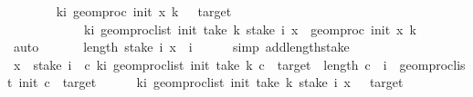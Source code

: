 \begin{isabellebody}
\ \ \ \ \ \ \isamarkupfalse%
\ {\isacartoucheopen}{\isasymforall}k{\isacharless}{\kern0pt}i{\isachardot}{\kern0pt}\ geom{\isacharunderscore}{\kern0pt}proc\ init\ x\ k\ {\isasymnotin}\ {\isacharbraceleft}{\kern0pt}{}{\isacharcomma}{\kern0pt}\ target{\isacharbraceright}{\kern0pt}{\isacartoucheclose}\isanewline
\ \ \ \ \ \ \ \ \ \ \ \ {\isacartoucheopen}{\isasymforall}k{\isacharless}{\kern0pt}i{\isachardot}{\kern0pt}\ geom{\isacharunderscore}{\kern0pt}proc{\isacharunderscore}{\kern0pt}list\ {\isacharparenleft}{\kern0pt}init{\isacharparenright}{\kern0pt}\ {\isacharparenleft}{\kern0pt}take\ k\ {\isacharparenleft}{\kern0pt}stake\ i\ x{\isacharparenright}{\kern0pt}{\isacharparenright}{\kern0pt}\ {\isacharequal}{\kern0pt}\ geom{\isacharunderscore}{\kern0pt}proc\ init\ x\ k{\isacartoucheclose}\isanewline
\ \ \ \ \ \ \isamarkupfalse%
\ auto\isanewline
\ \ \isamarkupfalse%
\isanewline
\ \ \isamarkupfalse%
\ {\isachardoublequoteopen}length\ {\isacharparenleft}{\kern0pt}stake\ i\ x{\isacharparenright}{\kern0pt}\ {\isacharequal}{\kern0pt}\ i{\isachardoublequoteclose}\isanewline
\ \ \ \ \isamarkupfalse%
\ {\isacharparenleft}{\kern0pt}simp\ add{\isacharcolon}{\kern0pt}length{\isacharunderscore}{\kern0pt}stake{\isacharparenright}{\kern0pt}\isanewline
\ \ \isamarkupfalse%
\ \isamarkupfalse%
\ {\isachardoublequoteopen}x\ {\isasymin}\ stake\ i\ {\isacharminus}{\kern0pt}{\isacharbackquote}{\kern0pt}\ {\isacharbraceleft}{\kern0pt}c{\isachardot}{\kern0pt}\ {\isacharparenleft}{\kern0pt}{\isasymforall}k{\isacharless}{\kern0pt}i{\isachardot}{\kern0pt}\ geom{\isacharunderscore}{\kern0pt}proc{\isacharunderscore}{\kern0pt}list\ {\isacharparenleft}{\kern0pt}init{\isacharparenright}{\kern0pt}\ {\isacharparenleft}{\kern0pt}take\ k\ c{\isacharparenright}{\kern0pt}\ {\isasymnotin}\ {\isacharbraceleft}{\kern0pt}{}{\isacharcomma}{\kern0pt}target{\isacharbraceright}{\kern0pt}{\isacharparenright}{\kern0pt}\ {\isasymand}\ length\ c\ {\isacharequal}{\kern0pt}\ i\ {\isasymand}\ geom{\isacharunderscore}{\kern0pt}proc{\isacharunderscore}{\kern0pt}list\ {\isacharparenleft}{\kern0pt}init{\isacharparenright}{\kern0pt}\ c\ {\isacharequal}{\kern0pt}\ target{\isacharbraceright}{\kern0pt}{\isachardoublequoteclose}\isanewline
\ \ \ \ \isamarkupfalse%
\ {\isacartoucheopen}{\isasymforall}k{\isacharless}{\kern0pt}i{\isachardot}{\kern0pt}\ geom{\isacharunderscore}{\kern0pt}proc{\isacharunderscore}{\kern0pt}list\ {\isacharparenleft}{\kern0pt}init{\isacharparenright}{\kern0pt}\ {\isacharparenleft}{\kern0pt}take\ k\ {\isacharparenleft}{\kern0pt}stake\ i\ x{\isacharparenright}{\kern0pt}{\isacharparenright}{\kern0pt}\ {\isasymnotin}\ {\isacharbraceleft}{\kern0pt}{}{\isacharcomma}{\kern0pt}\ target{\isacharbraceright}{\kern0pt}{\isacartoucheclose}\isanewline

\end{isabellebody}
